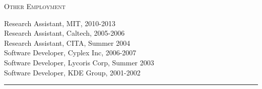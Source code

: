\documentclass{article}
\begin{document}
\parbox{\textwidth}{
\parbox[t]{0.28\textwidth}{ \raggedright \noindent \textsc{ Other Employment } }
\parbox[t]{0.72\textwidth}{ \raggedright

Research Assistant, MIT, 2010-2013 \\
Research Assistant, Caltech, 2005-2006 \\
Research Assistant, CITA, Summer 2004 \\
Software Developer, Cyplex Inc, 2006-2007 \\
Software Developer, Lycoris Corp, Summer 2003 \\
Software Developer, KDE Group, 2001-2002
\vspace{0.27cm}

}
\textcolor{light-gray}{\hrule}
}
\vspace{0.3cm}
\end{document}
